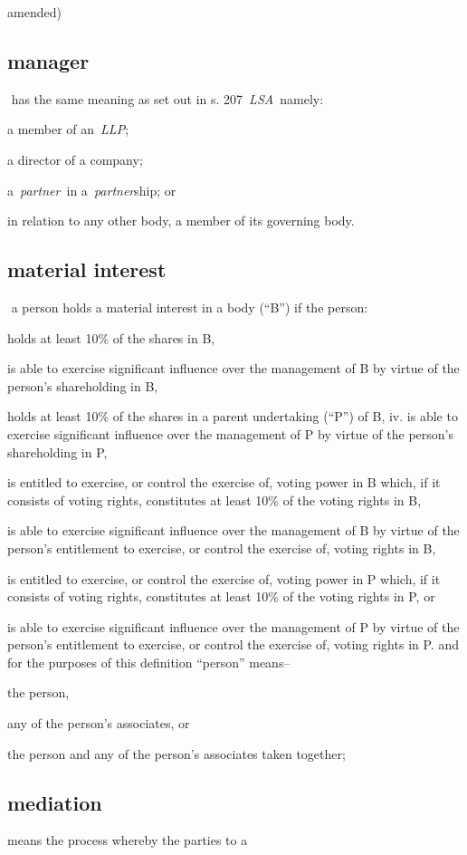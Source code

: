   amended)  \subsection{manager } has the same meaning as set out in s.
  207~\emph{LSA~}namely:
  \al \item  a member of an~\emph{LLP};
  \item  a director of
  a company;
  \item  a~\emph{partner~}in a~\emph{partner}ship; or
 \item  in
  relation to any other body, a member of its governing body. \la  \subsection{material interest } a person holds a material interest in a
  body (``B'') if the person: \rl \item  holds at least 10\% of the shares in
  B, \item  is able to exercise significant influence over the management
  of B by virtue of the person's shareholding in B, \item  holds at least
  10\% of the shares in a parent undertaking (``P'') of B, iv. is able
  to exercise significant influence over the management of P by virtue
  of the person's shareholding in P, \item  is entitled to exercise, or
  control the exercise of, voting power in B which, if it consists of
  voting rights, constitutes at least 10\% of the voting rights in
  B, \item  is able to exercise significant influence over the management
  of B by virtue of the person's entitlement to exercise, or control the
  exercise of, voting rights in B, \item  is entitled to exercise, or
  control the exercise of, voting power in P which, if it consists of
  voting rights, constitutes at least 10\% of the voting rights in P,
  or \item  is able to exercise significant influence over the management
  of P by virtue of the person's entitlement to exercise, or control the
  exercise of, voting rights in P.\lr and for the purposes of this
  definition ``person'' means-- \rl \item the person, \item any of the person's
  associates, or \item the person and any of the person's associates
  taken together;\lr  \subsection{mediation } means the process whereby the parties to a
